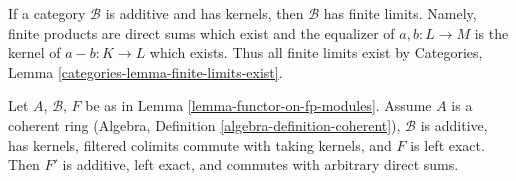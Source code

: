 \noindent
If a category $\mathcal{B}$ is additive and has kernels,
then $\mathcal{B}$ has finite limits. Namely, finite products
are direct sums which exist and the equalizer of $a, b : L \to M$
is the kernel of $a - b : K \to L$ which exists. Thus all finite
limits exist by Categories, Lemma \ref{categories-lemma-finite-limits-exist}.

\begin{lemma}
\label{lemma-functor-on-fp-modules-left-exact}
Let $A$, $\mathcal{B}$, $F$ be as in Lemma \ref{lemma-functor-on-fp-modules}.
Assume $A$ is a coherent ring (Algebra, Definition
\ref{algebra-definition-coherent}), $\mathcal{B}$ is additive, has kernels,
filtered colimits commute with taking kernels, and $F$ is left exact. Then
$F'$ is additive, left exact, and commutes with arbitrary direct sums.
\end{lemma}

